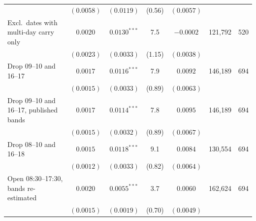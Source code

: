 \begin{tabular}{lcccccc}
 & $(0.0058)$ & $(0.0119)$ & (0.56) & $(0.0057)$ & & \\
Excl.\ dates with multi-day carry only & $0.0020$ & $0.0130^{***}$ & 7.5 & $-0.0002$ & 121,792 & 520 \\
 & $(0.0023)$ & $(0.0033)$ & (1.15) & $(0.0038)$ & & \\
Drop 09--10 and 16--17 & $0.0017$ & $0.0116^{***}$ & 7.9 & $0.0092$ & 146,189 & 694 \\
 & $(0.0015)$ & $(0.0033)$ & (0.89) & $(0.0063)$ & & \\
Drop 09--10 and 16--17, published bands & $0.0017$ & $0.0114^{***}$ & 7.8 & $0.0095$ & 146,189 & 694 \\
 & $(0.0015)$ & $(0.0032)$ & (0.89) & $(0.0067)$ & & \\
Drop 08--10 and 16--18 & $0.0015$ & $0.0118^{***}$ & 9.1 & $0.0084$ & 130,554 & 694 \\
 & $(0.0012)$ & $(0.0033)$ & (0.82) & $(0.0064)$ & & \\
Open 08:30--17:30, bands re-estimated & $0.0020$ & $0.0055^{***}$ & 3.7 & $0.0060$ & 162,624 & 694 \\
 & $(0.0015)$ & $(0.0019)$ & (0.70) & $(0.0049)$ & & \\
\bottomrule
\end{tabular}
